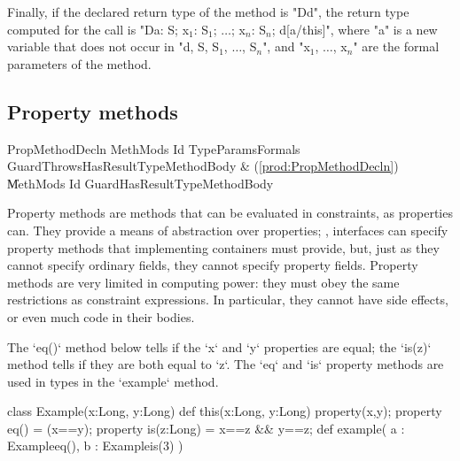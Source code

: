     Finally, if the declared return type of the method is
    \xcd"D{d}", the
    return type computed for the call is
    \xcdmath"D{a: S; x$_1$: S$_1$; $\dots$; x$_n$: S$_n$; d[a/this]}",
    where \xcd"a" is a new
    variable that does not occur in
    \xcdmath"d, S, S$_1$, $\dots$, S$_n$", and
    \xcdmath"x$_1$, $\dots$, x$_n$" are the formal
    parameters of the method.




\subsection{Property methods}

\begin{bbgrammar}
     PropMethodDecln \: MethMods Id TypeParams\opt Formals Guard\opt Throws\opt HasResultType\opt MethodBody & (\ref{prod:PropMethodDecln}) \\
                     \| MethMods Id Guard\opt HasResultType\opt MethodBody \\
\end{bbgrammar}

Property methods are methods that can be evaluated in constraints, as
properties can.   They provide a means of abstraction over properties; \eg,
interfaces can specify property methods that implementing containers must
provide, but, just as they cannot specify ordinary fields, they cannot specify
property fields.   Property methods are very limited in computing power: they
must obey the same restrictions as constraint expressions.  In particular,
they cannot have side effects, or even much code in their bodies.


\begin{ex}
The \xcd`eq()` method below tells if the \xcd`x` and \xcd`y`
properties are equal; the \xcd`is(z)` method tells if they are both equal to
\xcd`z`.  
The \xcd`eq` and \xcd`is` property methods are used in types in the
\xcd`example` method.
\begin{xten}
class Example(x:Long, y:Long) {
   def this(x:Long, y:Long) { property(x,y); }
   property eq() = (x==y);
   property is(z:Long) = x==z && y==z;
   def example( a : Example{eq()}, b : Example{is(3)} ) {}
}
\end{xten}
%
\end{ex}

